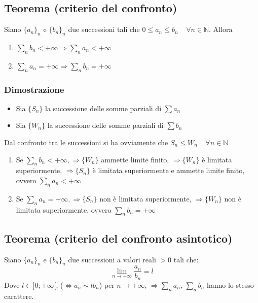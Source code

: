 \subsection{Teorema (criterio del confronto)}
Siano $\{a_n\}_n$ e $\{b_n\}_n$ due successioni tali che $0\le a_n\le b_n\;\;\;\;\forall n\in\mathbb{N}$. Allora 
\begin{enumerate}
\item $\sum\limits_n b_n<+\infty\Rightarrow\sum\limits_n a_n<+\infty$
\item $\sum\limits_n a_n=+\infty\Rightarrow\sum\limits_n b_n=+\infty$
\end{enumerate}
\subsubsection{Dimostrazione}
\begin{itemize}
\item Sia $\{S_n\}$ la successione delle somme parziali di $\sum a_n$
\item Sia $\{W_n\}$ la successione delle somme parziali di $\sum b_n$
\end{itemize}
Dal confronto tra le successioni si ha ovviamente che $S_n\le W_n\;\;\;\;\forall n\in\mathbb{N}$
\begin{enumerate}
\item Se $\sum\limits_n b_n<+\infty,\Rightarrow\{W_n\}$ ammette limite finito, $\Rightarrow\{W_n\}$ \`e limitata superiormente, $\Rightarrow\{S_n\}$ \`e limitata superiormente e ammette
limite finito, ovvero $\sum\limits_n a_n<+\infty$
\item Se $\sum\limits_n a_n=+\infty,\Rightarrow\{S_n\}$ non \`e limitata superiormente, $\Rightarrow\{W_n\}$ non \`e limitata superiormente, ovvero $\sum\limits_n b_n=+\infty$
\end{enumerate}
\subsection{Teorema (criterio del confronto asintotico)}
Siano $\{a_n\}_n$ e $\{b_n\}_n$ due successioni a valori reali $>0$ tali che:
\begin{equation}
\lim\limits_{n\rightarrow+\infty}\dfrac{a_n}{b_n}=l
\end{equation}
Dove $l\in]0;+\infty[$, ($\Leftrightarrow a_n\sim lb_n$) per $n\rightarrow+\infty$, $\Rightarrow\sum\limits_n a_n$, $\sum\limits_n b_n$ hanno lo stesso carattere.


